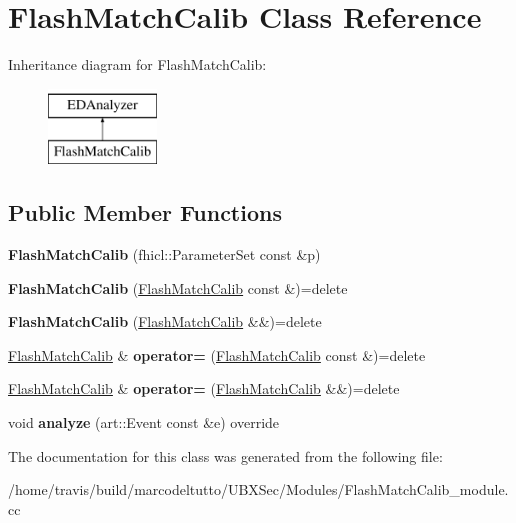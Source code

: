 \hypertarget{classFlashMatchCalib}{\section{Flash\-Match\-Calib Class Reference}
\label{classFlashMatchCalib}
}
Inheritance diagram for Flash\-Match\-Calib\-:\begin{figure}[H]
\begin{center}
\leavevmode
\includegraphics[height=2.000000cm]{classFlashMatchCalib}
\end{center}
\end{figure}
\subsection*{Public Member Functions}
\begin{DoxyCompactItemize}
\item 
\hypertarget{classFlashMatchCalib_ab8a3090aced748193d8ecab40777c601}{{\bfseries Flash\-Match\-Calib} (fhicl\-::\-Parameter\-Set const \&p)}\label{classFlashMatchCalib_ab8a3090aced748193d8ecab40777c601}

\item 
\hypertarget{classFlashMatchCalib_a860126b74a260601be3a56646ef17ede}{{\bfseries Flash\-Match\-Calib} (\hyperlink{classFlashMatchCalib}{Flash\-Match\-Calib} const \&)=delete}\label{classFlashMatchCalib_a860126b74a260601be3a56646ef17ede}

\item 
\hypertarget{classFlashMatchCalib_a6dfab98fd57d56f066734e09e9845fac}{{\bfseries Flash\-Match\-Calib} (\hyperlink{classFlashMatchCalib}{Flash\-Match\-Calib} \&\&)=delete}\label{classFlashMatchCalib_a6dfab98fd57d56f066734e09e9845fac}

\item 
\hypertarget{classFlashMatchCalib_ab75764da8234f622fccd0cc8de8db264}{\hyperlink{classFlashMatchCalib}{Flash\-Match\-Calib} \& {\bfseries operator=} (\hyperlink{classFlashMatchCalib}{Flash\-Match\-Calib} const \&)=delete}\label{classFlashMatchCalib_ab75764da8234f622fccd0cc8de8db264}

\item 
\hypertarget{classFlashMatchCalib_ad9454f46f9f44d3a626a0b556f51ac04}{\hyperlink{classFlashMatchCalib}{Flash\-Match\-Calib} \& {\bfseries operator=} (\hyperlink{classFlashMatchCalib}{Flash\-Match\-Calib} \&\&)=delete}\label{classFlashMatchCalib_ad9454f46f9f44d3a626a0b556f51ac04}

\item 
\hypertarget{classFlashMatchCalib_ad229de0f07b5e452a1cefaf73c9bb77b}{void {\bfseries analyze} (art\-::\-Event const \&e) override}\label{classFlashMatchCalib_ad229de0f07b5e452a1cefaf73c9bb77b}

\end{DoxyCompactItemize}


The documentation for this class was generated from the following file\-:\begin{DoxyCompactItemize}
\item 
/home/travis/build/marcodeltutto/\-U\-B\-X\-Sec/\-Modules/Flash\-Match\-Calib\-\_\-module.\-cc\end{DoxyCompactItemize}
